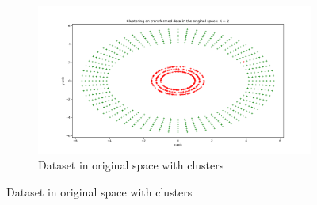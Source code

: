 \documentclass[a4paper,11pt]{article}
\begin{document}
\begin{mlsolution}
\begin{figure}[!htbp]
	\begin{subfigure}{0.5\textwidth}
		\centering
		\includegraphics[width=1.8\textwidth]{images/original_space.png}
		\caption{Dataset in original space with clusters}
		\label{t-space}
	\end{subfigure}

\end{figure}



\end{mlsolution}
\end{document}
